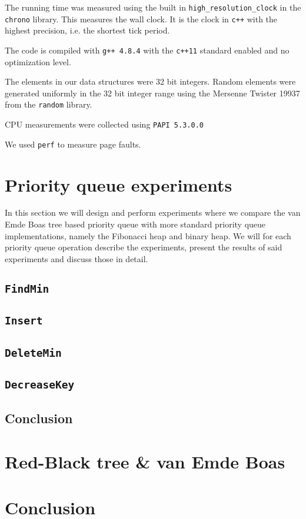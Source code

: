 \documentclass[a4paper,oneside,article,11pt]{memoir}
\begin{document}
The running time was measured using the built in \texttt{high\_resolution\_clock} in the \texttt{chrono} library. This measures the wall clock. It is the clock in \texttt{c++} with the highest precision, i.e. the shortest tick period.

The code is compiled with \texttt{g++ 4.8.4} with the \texttt{c++11} standard enabled and no optimization level.

The elements in our data structures were 32 bit integers. Random elements were generated uniformly in the 32 bit integer range using the Mersenne Twister 19937 from the \texttt{random} library.

CPU measurements were collected using \texttt{PAPI 5.3.0.0}

We used \texttt{perf} to measure page faults.

\chapter{Priority queue experiments}
\label{heap_experiments}
In this section we will design and perform experiments where we compare the van Emde Boas tree based priority queue with more standard priority queue implementations, namely the Fibonacci heap and binary heap. We will for each priority queue operation describe the experiments, present the results of said experiments and discuss those in detail.

\section{\texttt{FindMin}}


\section{\texttt{Insert}}


\section{\texttt{DeleteMin}}

\section{\texttt{DecreaseKey}}


\section{Conclusion}


\chapter{Red-Black tree \& van Emde Boas}


\chapter{Conclusion}



\end{document}
